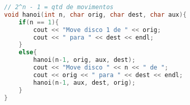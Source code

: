 \begin{lstlisting}[language=C++]
// 2^n - 1 = qtd de movimentos
void hanoi(int n, char orig, char dest, char aux){
    if(n == 1){
        cout << "Move disco 1 de " << orig;
        cout << " para " << dest << endl;
    }
    else{
        hanoi(n-1, orig, aux, dest);
        cout << "Move disco " << n << " de ";
        cout << orig << " para " << dest << endl;
        hanoi(n-1, aux, dest, orig);
    }
}
\end{lstlisting}